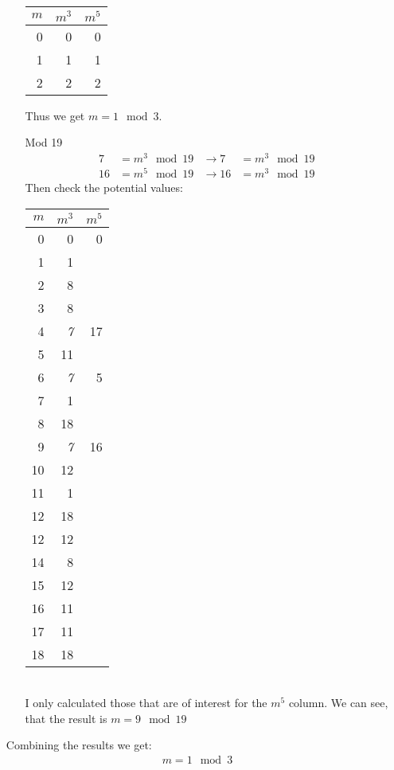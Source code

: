 \documentclass{article}
\begin{document}
\begin{enumerate}[label=\textbf{Task \arabic*:}]
\begin{enumerate}
\begin{table}[h]
\begin{tabular}{r|r|r}
					\textbf{$m$} & \textbf{$m^3$} & \textbf{$m^5$} \\ \hline
					0 & 0 & 0 \\ 
					1 & 1 & 1 \\ 
					2 & 2 & 2 \\ 
				\end{tabular}
			\end{table}
			Thus we get $m=1 \mod 3$.
			\item[Mod 19]
			\begin{align*}
				7 &= m^3 \mod 19 &\rightarrow 7 &= m^3 \mod 19\\
				16 &= m^5 \mod 19  &\rightarrow 16 &= m^3 \mod 19
			\end{align*}
			Then check the potential values:
			\begin{table}[h]
				\centering
				\begin{tabular}{r|r|r}
					\textbf{$m$} & \textbf{$m^3$} & \textbf{$m^5$} \\ \hline
					0 & 0 & 0 \\ 
					1 & 1 &  \\ 
					2 & 8 &  \\ 
					3 & 8 &  \\ 
					4 & \emph{7} & 17 \\ 
					5 & 11 &  \\ 
					6 & \emph{7} & 5 \\ 
					7 & 1 &  \\ 
					8 & 18 &  \\ 
					9 & \emph{7} & 16 \\ 
					10 & 12 &  \\ 
					11 & 1 &  \\ 
					12 & 18 &  \\ 
					12 & 12 &  \\ 
					14 & 8 &  \\ 
					15 & 12 &  \\ 
					16 & 11 &  \\ 
					17 & 11 &  \\ 
					18 & 18 &  \\ 
				\end{tabular}
			\end{table} \\
			I only calculated those that are of interest for the $m^5$ column. We can see, that the result is $m = 9 \mod 19$
		\end{enumerate}
		Combining the results we get:
		\begin{gather*}
			m = 1 \mod 3 \\

\end{gather*}
\end{enumerate}
\end{document}

